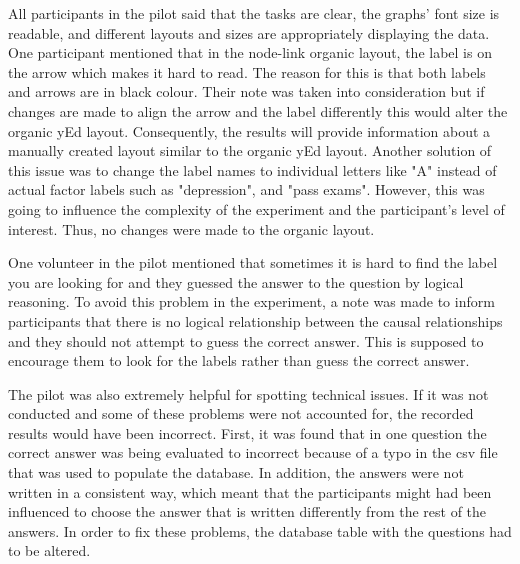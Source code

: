 \documentclass{l4proj}
\begin{document}
All participants in the pilot said that the tasks are clear, the graphs' font size is readable, and different layouts and sizes are appropriately displaying the data. One participant mentioned that in the node-link organic layout, the label is on the arrow which makes it hard to read. The reason for this is that both labels and arrows are in black colour. Their note was taken into consideration but if changes are made to align the arrow and the label differently this would alter the organic yEd layout. Consequently, the results will provide information about a manually created layout similar to the organic yEd layout. Another solution of this issue was to change the label names to individual letters like "A" instead of actual factor labels such as "depression", and "pass exams". However, this was going to influence the complexity of the experiment and the participant's level of interest. Thus, no changes were made to the organic layout.  

One volunteer in the pilot mentioned that sometimes it is hard to find the label you are looking for and they guessed the answer to the question by logical reasoning. To avoid this problem in the experiment, a note was made to inform participants that there is no logical relationship between the causal relationships and they should not attempt to guess the correct answer. This is supposed to encourage them to look for the labels rather than guess the correct answer. 

The pilot was also extremely helpful for spotting technical issues. If it was not conducted and some of these problems were not accounted for, the recorded results would have been incorrect. First, it was found that in one question the correct answer was being evaluated to incorrect because of a typo in the csv file that was used to populate the database. In addition, the answers were not written in a consistent way, which meant that the participants might had been influenced to choose the answer that is written differently from the rest of the answers. In order to fix these problems, the database table with the questions had to be altered. 
\end{document}
